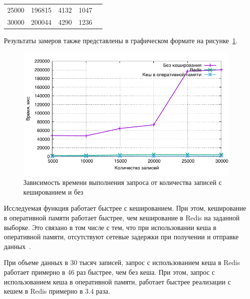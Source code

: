 \begin{table}[h!]
\begin{tabular}{|r|r|r|r|l}
25000                                                                               & 196815                                                                              & 4132                                                                                       & 1047                                                                                                       &  \\ \cline{1-4}
30000                                                                               & 200044                                                                              & 4290                                                                                       & 1236                                                                                                       &  \\ \cline{1-4}
\end{tabular}
\end{table}

\newpage

Результаты замеров также представлены в графическом формате на рисунке~\ref{img:research1}.

\begin{figure}[h!]
\centering
    \includegraphics[width=0.7\linewidth]{assets/1.pdf}
    \caption{Зависимость времени выполнения запроса от количества записей с кешированием и без}
    \label{img:research1}	
\end{figure}

Исследуемая функция работает быстрее с кешированием. При этом, кеширование в оперативной памяти работает быстрее, чем кеширование в Redis на заданной выборке. Это связано в том числе с тем, что при использовании кеша в оперативной памяти, отсутствуют сетевые задержки при получении и отправке данных~\cite{redis}.

При объеме данных в 30 тысяч записей, запрос с использованием кеша в Redis работает примерно в 46 раз быстрее, чем без кеша. При этом, запрос с использованием кеша в оперативной памяти, работает быстрее реализации с кешем в Redis примерно в 3.4 раза.

